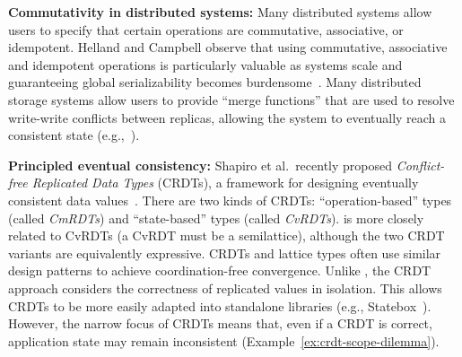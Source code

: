 \vspace{0.5em}\noindent
\textbf{Commutativity in distributed systems:} Many distributed systems allow
users to specify that certain operations are commutative, associative, or
idempotent. Helland and Campbell observe that using commutative, associative and
idempotent operations is particularly valuable as systems scale and guaranteeing
global serializability becomes burdensome~\cite{Helland2009}. Many
distributed storage systems allow users to provide ``merge functions'' that are
used to resolve write-write conflicts between replicas, allowing the system to
eventually reach a consistent state
(e.g.,~\cite{statebox,Lloyd2011,Reiher1994,Terry1995}).%



\vspace{0.5em}\noindent
\textbf{Principled eventual consistency:} Shapiro et al.\ recently proposed
\emph{Conflict-free Replicated Data Types} (CRDTs), a framework for designing
eventually consistent data values~\cite{Shapiro2011a,Shapiro2011b}. There are
two kinds of CRDTs: ``operation-based'' types (called \emph{CmRDTs}) and
``state-based'' types (called \emph{CvRDTs}). \lang is more closely related to
CvRDTs (a CvRDT must be a semilattice), although the two CRDT variants are
equivalently expressive. CRDTs and \lang lattice types often use similar design
patterns to achieve coordination-free convergence. Unlike \lang, the CRDT
approach considers the correctness of replicated values in isolation. This
allows CRDTs to be more easily adapted into standalone libraries (e.g.,
Statebox~\cite{statebox}). However, the narrow focus of CRDTs means that, even
if a CRDT is correct, application state may remain inconsistent
(Example~\ref{ex:crdt-scope-dilemma}).

